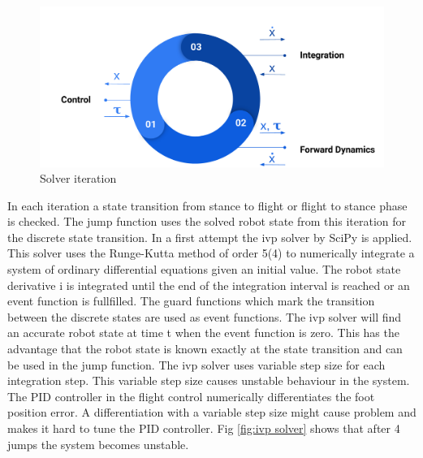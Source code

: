 \documentclass[10pt, conference]{IEEEtran}
\begin{document}
\begin{figure}[h]
   \centering
   \includegraphics[scale=0.12]{"assets/solver_iteration.png"}
   \caption{Solver iteration}
   \label{fig:solver_iteration}
\end{figure}

In each iteration a state transition from stance to flight or flight to stance phase is checked. The jump function uses the solved robot state from this iteration 
for the discrete state transition. 
In a first attempt the ivp solver by SciPy is applied. This solver uses the Runge-Kutta method of order 5(4) to numerically integrate a system of ordinary differential 
equations given an initial value. The robot state derivative i is integrated until the end of the integration interval is reached or an event function is 
fullfilled.  The guard functions which mark the transition between the discrete states are used as event functions. The ivp solver will find an accurate robot state 
at time t when the event function is zero. This has the advantage that the robot state is known exactly at the state transition and can be used in the jump function. 
The ivp solver uses variable step size for each integration step. This variable step size causes unstable behaviour in the system. The PID controller in the 
flight control numerically differentiates the foot position error. A differentiation with a variable step size might cause problem and makes 
it hard to tune the PID controller. Fig \ref{fig:ivp solver} shows that after 4 jumps the system becomes unstable.
\end{document}
